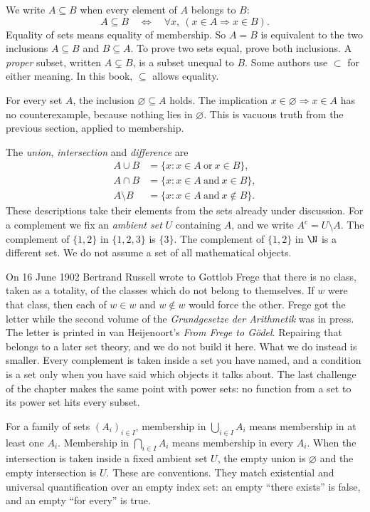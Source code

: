 We write $A\subseteq B$ when every element of $A$ belongs to $B$:
\[
A\subseteq B\quad\Longleftrightarrow\quad
\forall x,\ (x\in A\Rightarrow x\in B).
\]
Equality of sets means equality of membership. So $A=B$ is equivalent to the two inclusions $A\subseteq B$ and $B\subseteq A$. To prove two sets equal, prove both inclusions. A \emph{proper} subset, written $A\subsetneq B$, is a subset unequal to $B$. Some authors use $\subset$ for either meaning. In this book, $\subseteq$ allows equality.

For every set $A$, the inclusion $\varnothing\subseteq A$ holds. The implication $x\in\varnothing\Rightarrow x\in A$ has no counterexample, because nothing lies in $\varnothing$. This is vacuous truth from the previous section, applied to membership.

The \emph{union}, \emph{intersection} and \emph{difference} are
\begin{align*}
A\cup B&=\{x:x\in A\ \text{or}\ x\in B\},\\
A\cap B&=\{x:x\in A\ \text{and}\ x\in B\},\\
A\setminus B&=\{x:x\in A\ \text{and}\ x\notin B\}.
\end{align*}
These descriptions take their elements from the sets already under discussion. For a complement we fix an \emph{ambient set} $U$ containing $A$, and we write $A^c=U\setminus A$. The complement of $\{1,2\}$ in $\{1,2,3\}$ is $\{3\}$. The complement of $\{1,2\}$ in $\N$ is a different set. We do not assume a set of all mathematical objects.

On 16 June 1902 Bertrand Russell wrote to Gottlob Frege that there is no class, taken as a totality, of the classes which do not belong to themselves. If $w$ were that class, then each of $w\in w$ and $w\notin w$ would force the other. Frege got the letter while the second volume of the \emph{Grundgesetze der Arithmetik} was in press. The letter is printed in van Heijenoort's \emph{From Frege to G\"odel}. Repairing that belongs to a later set theory, and we do not build it here. What we do instead is smaller. Every complement is taken inside a set you have named, and a condition is a set only when you have said which objects it talks about. The last challenge of the chapter makes the same point with power sets: no function from a set to its power set hits every subset.

For a family of sets $(A_i)_{i\in I}$, membership in $\bigcup_{i\in I}A_i$ means membership in at least one $A_i$. Membership in $\bigcap_{i\in I}A_i$ means membership in every $A_i$. When the intersection is taken inside a fixed ambient set $U$, the empty union is $\varnothing$ and the empty intersection is $U$. These are conventions. They match existential and universal quantification over an empty index set: an empty ``there exists'' is false, and an empty ``for every'' is true.

